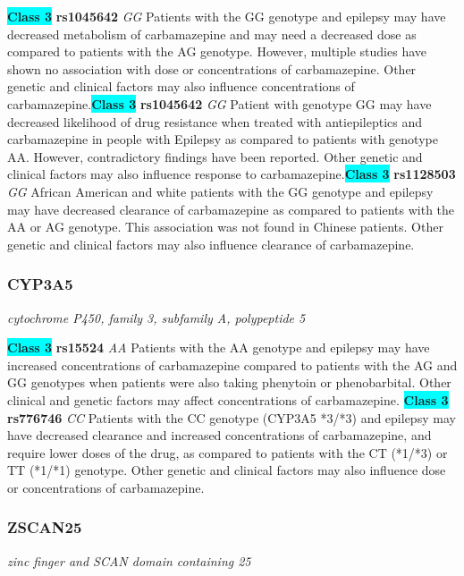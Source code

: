 \documentclass{report}
\begin{document}
\textbf{\colorbox{cyan} {Class 3}} \textbf{ rs1045642 } \textit{ GG }
Patients with the GG genotype and epilepsy may have decreased metabolism of carbamazepine and may need a decreased dose as compared to patients with the AG genotype. However, multiple studies have shown no association with dose or concentrations of carbamazepine. Other genetic and clinical factors may also influence concentrations of carbamazepine.\newline\textbf{\colorbox{cyan} {Class 3}} \textbf{ rs1045642 } \textit{ GG }
Patient with genotype GG may have decreased likelihood of drug resistance when treated with antiepileptics and carbamazepine in people with Epilepsy as compared to patients with genotype AA. However, contradictory findings have been reported. Other genetic and clinical factors may also influence response to carbamazepine.\newline\textbf{\colorbox{cyan} {Class 3}} \textbf{ rs1128503 } \textit{ GG }
African American and white patients with the GG genotype and epilepsy may have decreased clearance of carbamazepine as compared to patients with the AA or AG genotype. This association was not found in Chinese patients. Other genetic and clinical factors may also influence clearance of carbamazepine.\newline\subsubsection{ CYP3A5 }
\textit{ cytochrome P450, family 3, subfamily A, polypeptide 5 }

\textbf{\colorbox{cyan} {Class 3}} \textbf{ rs15524 } \textit{ AA }
Patients with the AA genotype and epilepsy may have increased concentrations of carbamazepine compared to patients with the AG and GG genotypes when patients were also taking phenytoin or phenobarbital. Other clinical and genetic factors may affect concentrations of carbamazepine. \newline\textbf{\colorbox{cyan} {Class 3}} \textbf{ rs776746 } \textit{ CC }
Patients with the CC genotype (CYP3A5 *3/*3) and epilepsy may have decreased clearance and increased concentrations of carbamazepine, and require lower doses of the drug, as compared to patients with the CT (*1/*3) or TT (*1/*1) genotype. Other genetic and clinical factors may also influence dose or concentrations of carbamazepine.\newline\subsubsection{ ZSCAN25 }
\textit{ zinc finger and SCAN domain containing 25 }
\end{document}

